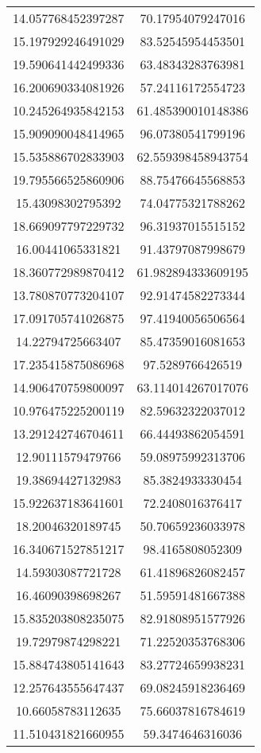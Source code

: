 \begin{table}
\begin{tabular}{cc}
14.057768452397287 & 70.17954079247016 \\
15.197929246491029 & 83.52545954453501 \\
19.590641442499336 & 63.48343283763981 \\
16.200690334081926 & 57.24116172554723 \\
10.245264935842153 & 61.485390010148386 \\
15.909090048414965 & 96.07380541799196 \\
15.535886702833903 & 62.559398458943754 \\
19.795566525860906 & 88.75476645568853 \\
15.43098302795392 & 74.04775321788262 \\
18.669097797229732 & 96.31937015515152 \\
16.00441065331821 & 91.43797087998679 \\
18.360772989870412 & 61.982894333609195 \\
13.780870773204107 & 92.91474582273344 \\
17.091705741026875 & 97.41940056506564 \\
14.22794725663407 & 85.47359016081653 \\
17.235415875086968 & 97.5289766426519 \\
14.906470759800097 & 63.114014267017076 \\
10.976475225200119 & 82.59632322037012 \\
13.291242746704611 & 66.44493862054591 \\
12.90111579479766 & 59.08975992313706 \\
19.38694427132983 & 85.3824933330454 \\
15.922637183641601 & 72.2408016376417 \\
18.20046320189745 & 50.70659236033978 \\
16.340671527851217 & 98.4165808052309 \\
14.59303087721728 & 61.41896826082457 \\
16.46090398698267 & 51.59591481667388 \\
15.835203808235075 & 82.91808951577926 \\
19.72979874298221 & 71.22520353768306 \\
15.884743805141643 & 83.27724659938231 \\
12.257643555647437 & 69.08245918236469 \\
10.66058783112635 & 75.66037816784619 \\
11.510431821660955 & 59.3474646316036 \\

\end{tabular}
\end{table}
